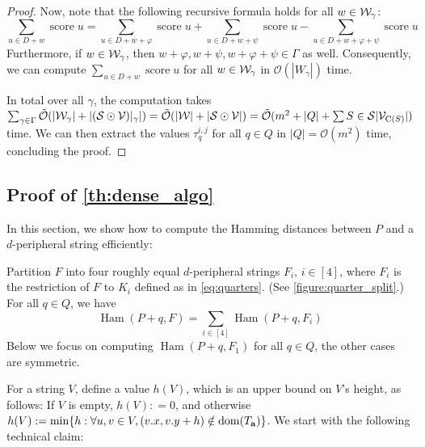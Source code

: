 \documentclass[11pt, letterpaper]{article}
\theoremstyle{plain}
\theoremstyle{definition}
\theoremstyle{remark}
\renewcommand{\O}{\mathcal{O}}
\newcommand{\tO}{\tilde{\mathcal{O}}}
\renewcommand{\S}{\mathcal{S}}
\newcommand{\V}{\mathcal{V}}
\renewcommand{\phi}{\varphi}
\DeclareMathOperator*{\score}{score}
\DeclareMathOperator*{\Ham}{Ham}
\begin{document}
\begin{proof}
Now, note that the following recursive formula holds for all $w \in \mathcal{W}_\gamma$:
%
$$\sum_{u \in D+w} \score{u} = \sum_{u \in D+w+\phi} \score{u} + \sum_{u \in D+w+\psi} \score{u} -\sum_{u \in D+w+\phi+\psi} \score{u}$$
%
Furthermore, if $w \in \mathcal{W}_\gamma$, then $w+\phi, w+\psi, w+\phi+\psi \in \Gamma$ as well. Consequently, we can compute $\sum_{u \in D+w} \score{u}$ for all $w \in \mathcal{W}_\gamma$ in $\O(|W_\gamma|)$ time. 

In total over all $\gamma$, the computation takes $\sum_{\gamma \in \Gamma} \tO(|\W_\gamma| + |(\S \odot \V) |_\gamma|) = \tO(|\W| + |\S \odot \V|) = \tO(m^2 + |Q| + \sum{S \in \S} |\V_{\getchar{S}}|)$ time. We can then extract the values $\tau^{i,j}_q$ for all $q \in Q$ in $|Q| = \O(m^2)$ time, concluding the proof. 
\end{proof}
	


\subsection{Proof of \cref{th:dense_algo}}
In this section, we show how to compute the Hamming distances between $P$ and a $d$-peripheral string efficiently:

\DenseAlgo

Partition $F$ into four roughly equal $d$-peripheral strings $F_i$, $i \in [4]$, where $F_i$ is the restriction of $F$ to $K_i$ defined as in \cref{eq:quarters}. (See \cref{figure:quarter_split}.) For all $q \in Q$, we have 
%
$$\Ham(P + q, F) = \sum_{i \in [4]} \Ham(P + q, F_i)$$
%
Below we focus on computing $\Ham(P + q, F_1)$ for all $q \in Q$, the other cases are symmetric. 

For a string $V$, define a value $h(V)$, which is an upper bound on $V$'s height, as follows: If $V$ is empty, $h(V): = 0$, and otherwise $h(V) := \min \{h : \forall u,v \in V, (v.x, v.y + h) \notin \operatorname*{dom}(T_\mathbf{a})\}$. We start with the following technical claim:
\end{document}

